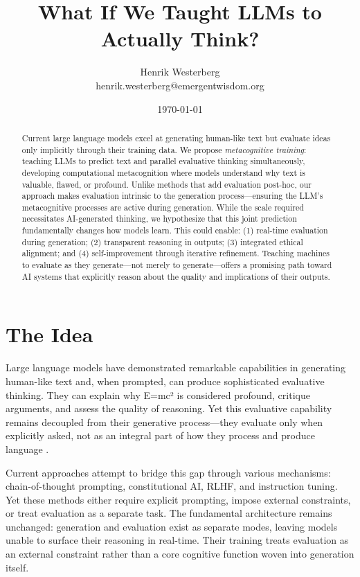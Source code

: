 \documentclass[11pt]{article}
\title{What If We Taught LLMs to Actually Think?}
\author{Henrik Westerberg\\
	\small{henrik.westerberg@emergentwisdom.org}}
\date{\today}
\begin{document}
	
	\maketitle
	
	\begin{abstract}
		\noindent
		Current large language models excel at generating human-like text but evaluate ideas only implicitly through their training data. We propose \textit{metacognitive training}: teaching LLMs to predict text and parallel evaluative thinking simultaneously, developing computational metacognition where models understand why text is valuable, flawed, or profound. Unlike methods that add evaluation post-hoc, our approach makes evaluation intrinsic to the generation process---ensuring the LLM's metacognitive processes are active during generation. While the scale required necessitates AI-generated thinking, we hypothesize that this joint prediction fundamentally changes how models learn. This could enable: (1) real-time evaluation during generation; (2) transparent reasoning in outputs; (3) integrated ethical alignment; and (4) self-improvement through iterative refinement. Teaching machines to evaluate as they generate---not merely to generate---offers a promising path toward AI systems that explicitly reason about the quality and implications of their outputs.
	\end{abstract}
	
	
	\section{The Idea}
	
	Large language models have demonstrated remarkable capabilities in generating human-like text and, when prompted, can produce sophisticated evaluative thinking. They can explain why E=mc² is considered profound, critique arguments, and assess the quality of reasoning. Yet this evaluative capability remains decoupled from their generative process---they evaluate only when explicitly asked, not as an integral part of how they process and produce language \cite{brown2020language}.
	
	Current approaches attempt to bridge this gap through various mechanisms: chain-of-thought prompting, constitutional AI, RLHF, and instruction tuning. Yet these methods either require explicit prompting, impose external constraints, or treat evaluation as a separate task. The fundamental architecture remains unchanged: generation and evaluation exist as separate modes, leaving models unable to surface their reasoning in real-time. Their training treats evaluation as an external constraint rather than a core cognitive function woven into generation itself.
	
\end{document}
